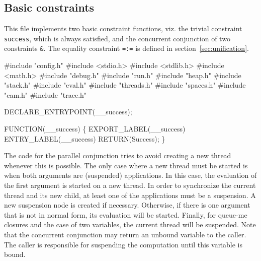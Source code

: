%
%
\subsection{Basic constraints}
This file implements two basic constraint functions, viz. the trivial
constraint \texttt{success}, which is always satisfied, and the
concurrent conjunction of two constraints \texttt{\&}. The equality
constraint \texttt{=:=} is defined in section~\ref{sec:unification}.

\nwenddocs{}\endmoddef\nwstartdeflinemarkup{}\nwenddeflinemarkup
#include "config.h"
#include <stdio.h>
#include <stdlib.h>
#include <math.h>
#include "debug.h"
#include "run.h"
#include "heap.h"
#include "stack.h"
#include "eval.h"
#include "threads.h"
#include "spaces.h"
#include "cam.h"
#include "trace.h"

DECLARE_ENTRYPOINT(__success);

FUNCTION(__success)
\{
    EXPORT_LABEL(__success)
 ENTRY_LABEL(__success)
    RETURN(Success);
\}

\nwendcode{}\nwdocspar
The code for the parallel conjunction tries to avoid creating a
new thread whenever this is possible. The only case where a new thread
must be started is when both arguments are (suspended)
applications. In this case, the evaluation of the first argument is
started on a new thread. In order to synchronize the current thread
and its new child, at least one of the applications must be a
suspension. A new suspension node is created if
necessary. Otherwise, if there is one argument that is not in normal
form, its evaluation will be started. Finally, for queue-me closures
and the case of two variables, the current thread will be
suspended. Note that the concurrent conjunction may return an unbound
variable to the caller. The caller is responsible for suspending the
computation until this variable is bound.


